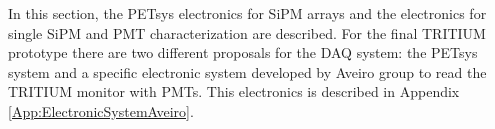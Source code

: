 In this section, the PETsys electronics for SiPM arrays and the electronics for single SiPM and PMT characterization are described. For the final TRITIUM prototype there are two different proposals for the DAQ system: the PETsys system and a specific electronic system developed by Aveiro group to read the TRITIUM monitor with PMTs. This electronics is described in Appendix \ref{App:ElectronicSystemAveiro}.


 